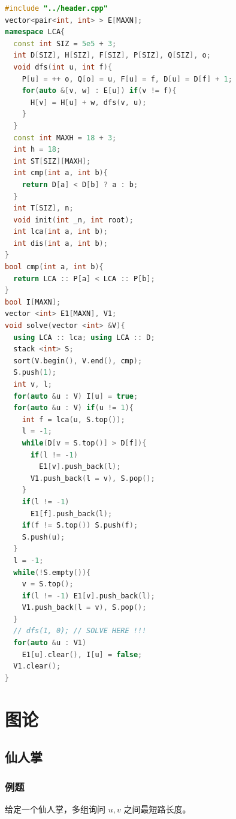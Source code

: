 \documentclass[10pt]{ctexart}
\begin{document}
\begin{multicols}{3}
\begin{lstlisting}[language={C++}]
#include "../header.cpp"
vector<pair<int, int> > E[MAXN];
namespace LCA{
  const int SIZ = 5e5 + 3;
  int D[SIZ], H[SIZ], F[SIZ], P[SIZ], Q[SIZ], o;
  void dfs(int u, int f){
    P[u] = ++ o, Q[o] = u, F[u] = f, D[u] = D[f] + 1;
    for(auto &[v, w] : E[u]) if(v != f){
      H[v] = H[u] + w, dfs(v, u);
    }
  }
  const int MAXH = 18 + 3;
  int h = 18;
  int ST[SIZ][MAXH];
  int cmp(int a, int b){
    return D[a] < D[b] ? a : b;
  }
  int T[SIZ], n;
  void init(int _n, int root);
  int lca(int a, int b);
  int dis(int a, int b);
}
bool cmp(int a, int b){
  return LCA :: P[a] < LCA :: P[b];
}
bool I[MAXN];
vector <int> E1[MAXN], V1;
void solve(vector <int> &V){
  using LCA :: lca; using LCA :: D;
  stack <int> S;
  sort(V.begin(), V.end(), cmp);
  S.push(1);
  int v, l;
  for(auto &u : V) I[u] = true;
  for(auto &u : V) if(u != 1){
    int f = lca(u, S.top());
    l = -1;
    while(D[v = S.top()] > D[f]){
      if(l != -1)
        E1[v].push_back(l);
      V1.push_back(l = v), S.pop();
    }
    if(l != -1)
      E1[f].push_back(l);
    if(f != S.top()) S.push(f);
    S.push(u);
  }
  l = -1;
  while(!S.empty()){
    v = S.top();
    if(l != -1) E1[v].push_back(l);
    V1.push_back(l = v), S.pop();
  }
  // dfs(1, 0); // SOLVE HERE !!!
  for(auto &u : V1)
    E1[u].clear(), I[u] = false;
  V1.clear();
}
\end{lstlisting}

    \section{图论}\label{ux56feux8bba}

    \subsection{仙人掌}\label{ux4ed9ux4ebaux638c}

    \subsubsection{例题}\label{ux4f8bux9898-4}

    给定一个仙人掌，多组询问 \(u, v\) 之间最短路长度。


\end{multicols}
\end{document}
